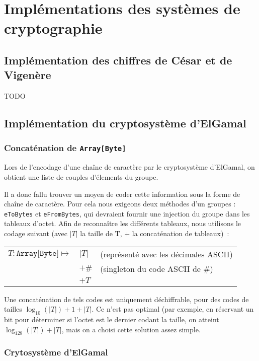\documentclass[11pt]{article} %
\begin{document}
\section{Implémentations des systèmes de cryptographie}

\subsection{Implémentation des chiffres de César et de Vigenère}

TODO

\subsection{Implémentation du cryptosystème d'ElGamal}

\subsubsection{Concaténation de \texttt{Array[Byte]}}

Lors de l'encodage d'une chaîne de caractère par le cryptosystème d'ElGamal, on obtient une liste de couples d'élements du groupe.

Il a donc fallu trouver un moyen de coder cette information sous la forme de chaîne de caractère. %
Pour cela nous exigeons deux méthodes d'un groupes : \texttt{eToBytes} et \texttt{eFromBytes}, qui devraient fournir une injection du groupe dans les tableaux d'octet. Afin de reconnaître les différents tableaux, nous utilisons le codage suivant (avec $|T|$ la taille de T, $+$ la concaténation de tableaux)~:\\
\begin{tabular}{rll}
  $T:\texttt{Array[Byte]} \mapsto$ & $|T|$ & (représenté avec les décimales ASCII) \\
  & $+  \#$ & (singleton du code ASCII de \#)\\
  & $+ T$ & \\
\end{tabular}

Une concaténation de tels codes est uniquement déchiffrable, pour des codes de tailles $\log_{10}(|T|) + 1 + |T|$. Ce n'est pas optimal (par exemple, en réservant un bit pour déterminer si l'octet est le dernier codant la taille, on atteint $\log_{128}(|T|) + |T|$, mais on a choisi cette solution assez simple.

\subsubsection{Crytosystème d'ElGamal}
\end{document}
